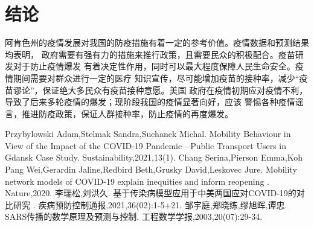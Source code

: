 \documentclass[withoutpreface,bwprint]{cumcmthesis} %
\begin{document}
\section{结论}
阿肯色州的疫情发展对我国的防疫措施有着一定的参考价值。疫情数据和预测结果均表明，
政府需要有强有力的措施来推行政策，且需要民众的积极配合。疫苗研发对于防止疫情爆发
有着决定性作用，同时可以最大程度保障人民生命安全。疫情期间需要对群众进行一定的医疗
知识宣传，尽可能增加疫苗的接种率，减少“疫苗谬论”，保证绝大多民众有疫苗接种意愿。美国
政府在疫情初期应对疫情不利，导致了后来多轮疫情的爆发；现阶段我国的疫情显著向好，应该
警惕各种疫情谣言，推进防疫政策，保证人群接种率，防止疫情的再度爆发。

\begin{thebibliography}{9}%
    \renewcommand\refname{}
    Przybylowski Adam,Stelmak Sandra,Suchanek Michal.
    \newblock Mobility Behaviour in View of the Impact of the COVID-19 Pandemic—Public Transport Users in Gdansk Case Study{}\allowbreak[J].
    \newblock Sustainability,2021,13(1).
    Chang Serina,Pierson Emma,Koh Pang Wei,Gerardin Jaline,Redbird Beth,Grusky David,Leskovec Jure.
    \newblock Mobility network models of COVID-19 explain inequities and inform reopening {}\allowbreak[J].
    \newblock Nature,2020.
    李瑞松,刘洪久.
    \newblock 基于传染病模型应用于中美两国应对COVID-19的对比研究 {}\allowbreak[J].
    \newblock 疾病预防控制通报,2021,36(02):1-5+21.
    邹宇庭,郑晓练,缪旭晖,谭忠.
    \newblock SARS传播的数学原理及预测与控制{}\allowbreak[J].
    \newblock ⼯程数学学报,2003,20(07):29-34.
\end{thebibliography}
\end{document}
